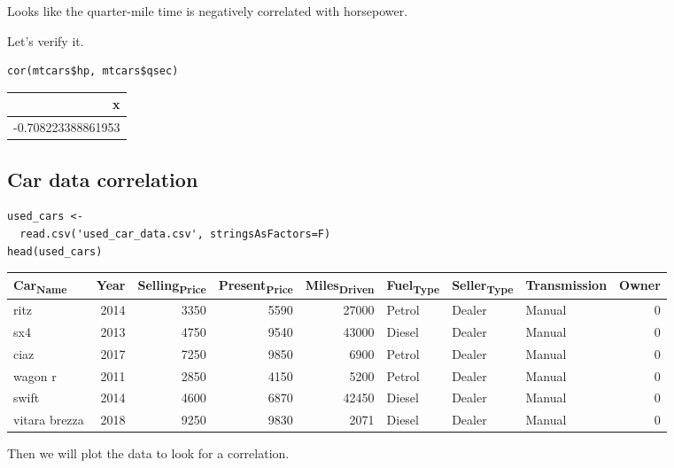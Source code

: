 \documentclass[11pt]{article}
\begin{document}
Looks like the quarter-mile time is negatively correlated with horsepower.

Let's verify it.

\begin{verbatim}
cor(mtcars$hp, mtcars$qsec)
\end{verbatim}

\begin{org}
\begin{center}
\begin{tabular}{r}
x\\
\hline
-0.708223388861953\\
\end{tabular}
\end{center}
\end{org}

\subsection{Car data correlation}
\label{sec:orgff120e9}

\begin{verbatim}
used_cars <-
  read.csv('used_car_data.csv', stringsAsFactors=F)
head(used_cars)
\end{verbatim}

\begin{org}
\begin{center}
\begin{tabular}{lrrrrlllr}
Car\textsubscript{Name} & Year & Selling\textsubscript{Price} & Present\textsubscript{Price} & Miles\textsubscript{Driven} & Fuel\textsubscript{Type} & Seller\textsubscript{Type} & Transmission & Owner\\
\hline
ritz & 2014 & 3350 & 5590 & 27000 & Petrol & Dealer & Manual & 0\\
sx4 & 2013 & 4750 & 9540 & 43000 & Diesel & Dealer & Manual & 0\\
ciaz & 2017 & 7250 & 9850 & 6900 & Petrol & Dealer & Manual & 0\\
wagon r & 2011 & 2850 & 4150 & 5200 & Petrol & Dealer & Manual & 0\\
swift & 2014 & 4600 & 6870 & 42450 & Diesel & Dealer & Manual & 0\\
vitara brezza & 2018 & 9250 & 9830 & 2071 & Diesel & Dealer & Manual & 0\\
\end{tabular}
\end{center}
\end{org}

Then we will plot the data to look for a correlation.
\end{document}
